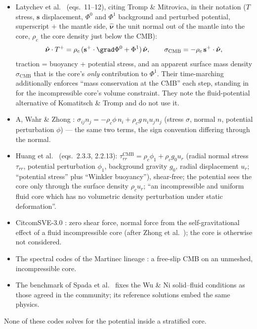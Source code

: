 \documentclass[11pt]{article}
\numberwithin{equation}{section}
\theoremstyle{remark}
\newcommand{\vs}{\mathbf{s}}
\begin{document}
\begin{itemize}
\item Latychev et al.\ \cite{Latychev2005} (eqs.~11--12), citing Tromp \&
  Mitrovica, in their notation ($T$ stress, $\vs$ displacement, $\Phi^0$
  and $\Phi^1$ background and perturbed potential, superscript $+$ the
  mantle side, $\hat{\bm{\nu}}$ the unit normal out of the mantle into the
  core, $\rho_c$ the core density just below the CMB):
  \begin{equation}
    \hat{\bm{\nu}}\cdot T^+ = \rho_c\,(\vs^+\cdot\grad\Phi^0 + \Phi^1)\,
      \hat{\bm{\nu}}, \qquad
    \sigma_{\mathrm{CMB}} = -\rho_c\,\vs^+\cdot\hat{\bm{\nu}},
  \end{equation}
  traction = buoyancy + potential stress, and an apparent surface mass
  density $\sigma_{\mathrm{CMB}}$ that is the core's \emph{only}
  contribution to $\Phi^1$. Their time-marching additionally enforces
  ``mass conservation at the CMB'' each step, standing in for the
  incompressible core's volume constraint. They note the fluid-potential
  alternative of Komatitsch \& Tromp \cite{KomatitschTromp2002} and do
  not use it.
\item A, Wahr \& Zhong \cite{AWahrZhong2013}: $\sigma_{ij}n_j = -\rho_c\phi\,
  n_i + \rho_c g\,n_i u_jn_j$ (stress $\sigma$, normal $n$, potential
  perturbation $\phi$) --- the same two terms, the sign convention
  differing through the normal.
\item Huang et al.\ \cite{Huang2023} (eqs.~2.3.3, 2.2.13):
  $\tau^{\mathrm{CMB}}_{rr} = \rho_c\phi_1 + \rho_c g_0 u_r$ (radial normal
  stress $\tau_{rr}$, potential perturbation $\phi_1$, background gravity
  $g_0$, radial displacement $u_r$; ``potential stress'' plus ``Winkler
  buoyancy''), shear-free; the potential sees the core only through the
  surface density $\rho_c u_r$; ``an incompressible and uniform fluid core
  which has no volumetric density perturbation under static
  deformation''.
\item CitcomSVE-3.0 \cite{CitcomSVE2025}: zero shear force, normal force
  from the self-gravitational effect of a fluid incompressible core
  (after Zhong et al.\ \cite{Zhong2003}); the core is otherwise not
  considered.
\item The spectral codes of the Martinec lineage \cite{Martinec1999,
  Martinec2000}: a free-slip CMB on an unmeshed, incompressible core.
\item The benchmark of Spada et al.\ \cite{Spada2011} fixes the Wu \& Ni
  \cite{WuNi1996} solid--fluid conditions as those agreed in the
  community; its reference solutions embed the same physics.
\end{itemize}
None of these codes solves for the potential inside a stratified core.
\end{document}
